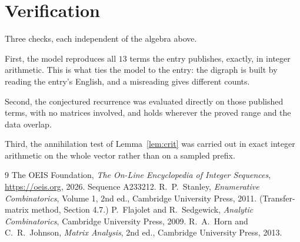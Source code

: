 \documentclass[11pt,a4paper]{article}
\theoremstyle{plain}
\theoremstyle{definition}
\begin{document}
\section{Verification}

Three checks, each independent of the algebra above.

First, the model reproduces all $13$ terms the entry publishes, exactly, in integer
arithmetic. This is what ties the model to the entry: the digraph is built by reading the
entry's English, and a misreading gives different counts.

Second, the conjectured recurrence was evaluated directly on those published terms, with no
matrices involved, and holds wherever the proved range and the data overlap.

Third, the annihilation test of Lemma~\ref{lem:crit} was carried out in exact integer
arithmetic on the whole vector rather than on a sampled prefix.

\begin{thebibliography}{9}
 The OEIS Foundation, \emph{The On-Line Encyclopedia of Integer
Sequences}, \url{https://oeis.org}, 2026. Sequence A233212.
 R.~P.~Stanley, \emph{Enumerative Combinatorics}, Volume 1, 2nd ed.,
Cambridge University Press, 2011. (Transfer-matrix method, Section 4.7.)
 P.~Flajolet and R.~Sedgewick, \emph{Analytic Combinatorics}, Cambridge
University Press, 2009.
 R.~A.~Horn and C.~R.~Johnson, \emph{Matrix Analysis}, 2nd ed., Cambridge
University Press, 2013.
\end{thebibliography}
\end{document}
